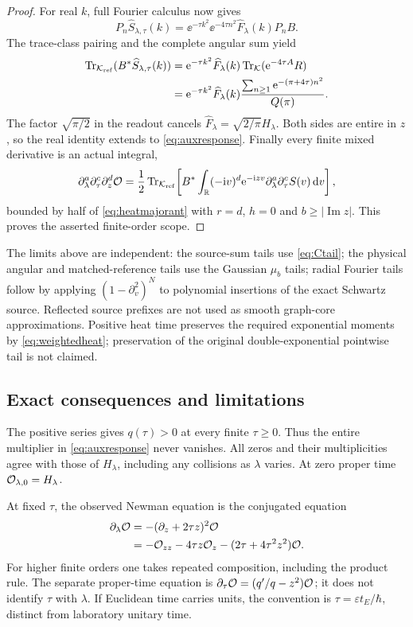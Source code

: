 \begin{proof}
For real $k$, full Fourier calculus now gives
\[
 P_n\widehat S_{\lambda,\tau}(k)
 =\ee^{-\tau k^2}\ee^{-4\tau n^2}\widehat F_\lambda(k)P_nB.
\]
The trace-class pairing and the complete angular sum yield
\begin{align*}
 \operatorname{Tr}_{\mathcal K_{\rm ref}}(B^*\widehat S_{\lambda,\tau}(k))
 &=\mathrm e^{-\tau k^2}\widehat F_\lambda(k)\operatorname{Tr}_\mathcal K(\mathrm e^{-4\tau A}R)\\
 &=\mathrm e^{-\tau k^2}\widehat F_\lambda(k)
   \frac{\sum_{n\ge1}\mathrm e^{-(\pi+4\tau)n^2}}{Q(\pi)}.
\end{align*}
The factor $\sqrt{\pi/2}$ in the readout cancels
$\widehat F_\lambda=\sqrt{2/\pi}H_\lambda$.
Both sides are entire in $z$, so the real identity extends to
\eqref{eq:auxresponse}. Finally every finite mixed derivative is an
actual integral,
\begin{equation}\label{eq:Omixed}
 \partial_\lambda^a\partial_\tau^c\partial_z^d\mathcal O
 =\frac12\operatorname{Tr}_{\mathcal K_{\rm ref}}\!\left[
 B^*\int_\mathbb R(-\mathrm i v)^d\mathrm e^{-\mathrm i zv}
 \partial_\lambda^a\partial_\tau^c S(v)\,\mathrm d v\right],
\end{equation}
bounded by half of \eqref{eq:heatmajorant} with $r=d$, $h=0$ and
$b\ge|\operatorname{Im}z|$. This proves the asserted finite-order scope.
\end{proof}

The limits above are independent: the source-sum tails use
\eqref{eq:Ctail}; the physical angular and matched-reference tails use
the Gaussian $\mu_b$ tails; radial Fourier tails follow by applying
$(1-\partial_v^2)^N$ to polynomial insertions of the exact Schwartz
source. Reflected source prefixes are not used as smooth graph-core
approximations. Positive heat time preserves the required exponential
moments by \eqref{eq:weightedheat}; preservation of the original
double-exponential pointwise tail is not claimed.

\subsection{Exact consequences and limitations}
The positive series gives $q(\tau)>0$ at every finite $\tau\ge0$.
Thus the entire multiplier in \eqref{eq:auxresponse} never vanishes.
All zeros and their multiplicities agree with those of $H_\lambda$,
including any collisions as $\lambda$ varies. At zero proper time
$\mathcal O_{\lambda,0}=H_\lambda$.

At fixed $\tau$, the observed Newman equation is the conjugated equation
\begin{equation}\label{eq:modifiedPDE}
 \begin{aligned}
 \partial_\lambda\mathcal O
 &=-(\partial_z+2\tau z)^2\mathcal O\\
 &=-\mathcal O_{zz}-4\tau z\mathcal O_z-(2\tau+4\tau^2z^2)\mathcal O.
 \end{aligned}
\end{equation}
For higher finite orders one takes repeated composition, including the
product rule. The separate proper-time equation is
$\partial_\tau\mathcal O=(q'/q-z^2)\mathcal O$; it does not identify $\tau$ with
$\lambda$. If Euclidean time carries units, the convention is
$\tau=\varepsilon t_E/\hbar$, distinct from laboratory unitary time.

